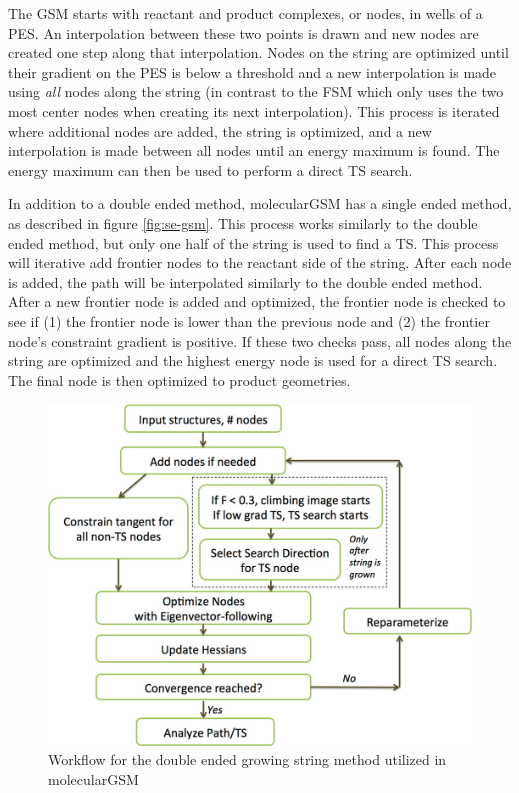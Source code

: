 \documentclass[preprint, 11pt]{elsarticle} %
\begin{document}
The GSM starts with reactant and product complexes, or nodes, in wells of a PES.
An interpolation between these two points is drawn and new nodes are created one step along that interpolation. 
Nodes on the string are optimized  until their gradient on the PES is below a threshold and a new interpolation is made using \textit{all} nodes along the string (in contrast to the FSM which only uses the two most center nodes when creating its next interpolation).
This process is iterated where additional nodes are added, the string is optimized, and a new interpolation is made between all nodes until an energy maximum is found. 
The energy maximum can then be used to perform a direct TS search.

In addition to a double ended method, molecularGSM has a single ended method, as described in figure \ref{fig:se-gsm}.
This process works similarly to the double ended method, but only one half of the string is used to find a TS.
This process will iterative add frontier nodes to the reactant side of the string.
After each node is added, the path will be interpolated similarly to the double ended method.
After a new frontier node is added and optimized, the frontier node is checked to see if (1) the frontier node is lower than the previous node and (2) the frontier node's constraint gradient is positive. 
If these two checks pass, all nodes along the string are optimized and the highest energy node is used for a direct TS search.
The final node is then optimized to product geometries.


\begin{figure}
    \centering
    \includegraphics[width=5in]{gsm}
    \caption{Workflow for the double ended growing string method utilized in molecularGSM \cite{Zimmerman:2013jctc}}
    \label{fig:gsm}
\end{figure}
\end{document}
